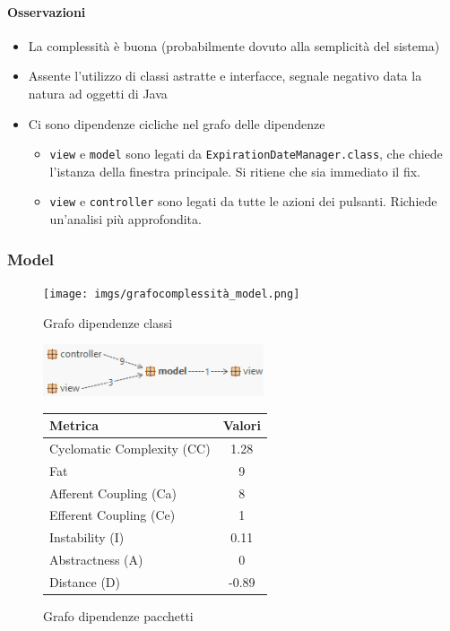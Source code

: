\documentclass{article}
\begin{document}
\paragraph{Osservazioni}
\begin{itemize}
    \item La complessità è buona (probabilmente dovuto alla semplicità del sistema)
    \item Assente l'utilizzo di classi astratte e interfacce, segnale negativo data la natura ad oggetti di Java
    \item Ci sono dipendenze cicliche nel grafo delle dipendenze
    \begin{itemize}
        \item \texttt{view} e \texttt{model} sono legati da \texttt{ExpirationDateManager.class}, che chiede l'istanza della finestra principale. Si ritiene che sia immediato il fix.
        \item \texttt{view} e \texttt{controller} sono legati da tutte le azioni dei pulsanti. Richiede un'analisi più approfondita.
    \end{itemize}
\end{itemize}

\subsubsection{Model}

\begin{figure}[H]
    \centering
    \texttt{[image: imgs/grafocomplessità\_model.png]}
    \caption{Grafo dipendenze classi}
    \label{fig:enter-label}
\end{figure}

\begin{figure}[H]
  \centering
  \begin{minipage}{0.4\textwidth}
    \centering
    \includegraphics[width=6.5cm]{imgs/coupling_model.png}
    \caption{Grafo dipendenze pacchetti}
    \label{fig:enter-label}
  \end{minipage}
  \hfill
  \begin{minipage}{0.4\textwidth}
    \begin{tabular}{lc}
        \toprule
        \textbf{Metrica} & \textbf{Valori} \\
        \midrule
        Cyclomatic Complexity (CC) & \cellcolor{green}1.28 \\
        Fat & 9 \\
        Afferent Coupling (Ca) & 8 \\
        Efferent Coupling (Ce) & 1 \\
        Instability (I) & \cellcolor{green}0.11 \\
        Abstractness (A) & \cellcolor{red}0 \\
        Distance (D) & \cellcolor{red}-0.89 \\
        \bottomrule
    \end{tabular}
  \end{minipage}
\end{figure}
\end{document}
